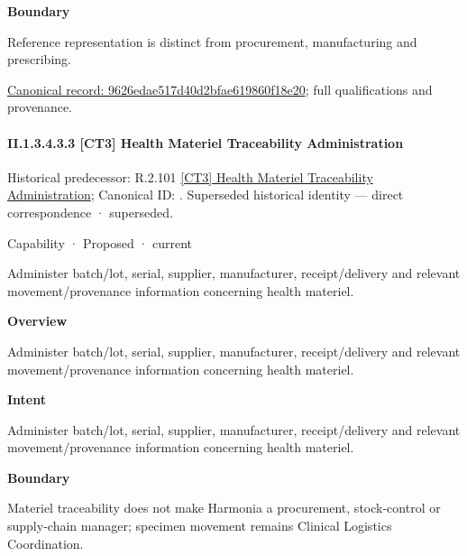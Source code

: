 \textbf{Boundary}



Reference representation is distinct from procurement, manufacturing and prescribing.


{\footnotesize \href{../../../../continuum/strategy/capability/9626edae517d40d2bfae619860f18e20.md}{Canonical record: 9626edae517d40d2bfae619860f18e20}; full qualifications and provenance.}\par
\paragraph*{II.1.3.4.3.3 [CT3] Health Materiel Traceability Administration}
\label{navigation:II.1.3.4.3.3}

{\small Historical predecessor: R.2.101 \hyperref[element:f1b888e8d50c4019ac1afe162d6223f3]{[CT3] Health Materiel Traceability Administration}; Canonical ID: \texttt{}. Superseded historical identity — direct correspondence · superseded.}\par
\label{element:2d41ed0f00a94a4b90ffe87d6fd4e9fe}
{\small Capability · Proposed · current}\par

Administer batch/lot, serial, supplier, manufacturer, receipt/delivery and relevant movement/provenance information concerning health materiel.



\textbf{Overview}



Administer batch/lot, serial, supplier, manufacturer, receipt/delivery and relevant movement/provenance information concerning health materiel.



\textbf{Intent}



Administer batch/lot, serial, supplier, manufacturer, receipt/delivery and relevant movement/provenance information concerning health materiel.



\textbf{Boundary}



Materiel traceability does not make Harmonia a procurement, stock-control or supply-chain manager; specimen movement remains Clinical Logistics Coordination.


